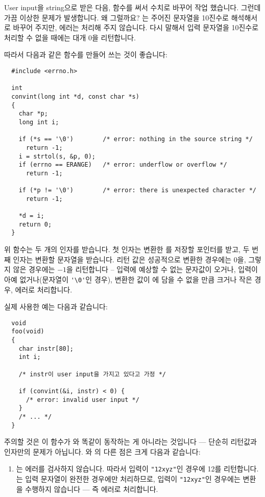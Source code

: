 \begin{faq}	\label{str2int}
	User input을 string으로 받은 다음,  함수를 써서
	수치로 바꾸어 작업 했습니다.  그런데 가끔 이상한 문제가
	발생합니다.  왜 그럴까요?
\A
	는 주어진 문자열을 10진수로 해석해서
	로 바꾸어 주지만, 
	에러는 처리해 주지 않습니다.
	다시 말해서 입력 문자열을 10진수로 처리할 수 없을 때에는
	대개 0을 리턴합니다.

	따라서 다음과 같은 함수를 만들어 쓰는 것이 좋습니다:
\begin{verbatim}
  #include <errno.h>

  int
  convint(long int *d, const char *s)
  {
    char *p;
    long int i;

    if (*s == '\0')        /* error: nothing in the source string */
      return -1;
    i = strtol(s, &p, 0);
    if (errno == ERANGE)   /* error: underflow or overflow */
      return -1;

    if (*p != '\0')        /* error: there is unexpected character */
      return -1;

    *d = i;
    return 0;
  }
\end{verbatim}

	위 함수는 두 개의 인자를 받습니다. 첫 인자는 변환한 를
	저장할
	포인터를 받고, 두 번째 인자는 변환할 문자열을 받습니다.
	리턴 값은 성공적으로 변환한 경우에는 0을, 그렇지 않은 경우에는 $-1$을
	리턴합니다 -- 입력에 예상할 수 없는 문자값이 오거나, 입력이 아예
	없거나(문자열이 \verb+'\0'+인 경우), 변환한 값이 에
	담을 수 없을 만큼 크거나 작은 경우, 에러로 처리합니다.

	실제 사용한 예는 다음과 같습니다:

\begin{verbatim}
  void
  foo(void)
  {
    char instr[80];
    int i;

    /* instr이 user input을 가지고 있다고 가정 */

    if (convint(&i, instr) < 0) {
      /* error: invalid user input */
    }
    /* ... */
  }
\end{verbatim}

	주의할 것은 이  함수가 와 똑같이 동작하는 게
	아니라는 것입니다 --- 단순히 리턴값과 인자만의 문제가 아닙니다.
	와 의 다른 점은 크게 다음과 같습니다:

\begin{enumerate}
\item 
	는 에러를 검사하지 않습니다.
	따라서 입력이 \verb+"12xyz"+인 경우에 12를 리턴합니다.
	는 입력 문자열이 완전한 경우에만 처리하므로,
	입력이 \verb+"12xyz"+인 경우에는  변환을 수행하지 않습니다
	--- 즉 에러로 처리합니다.


\end{enumerate}
\end{faq}
